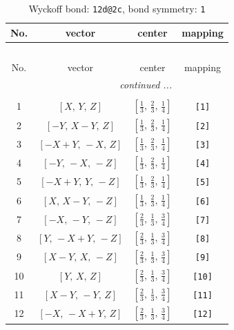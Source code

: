 \documentclass[fleqn,8pt]{jsarticle}
\begin{document}
\begin{longtable}{cccc}
\caption{Wyckoff bond: {\tt 12d@2c}, bond symmetry: {\tt 1}}
 \\
 \hline \hline
No. & vector & center & mapping \\ \hline \endfirsthead

\multicolumn{3}{l}{\tablename\ \thetable{}} \\
 \hline \hline
No. & vector & center & mapping \\ \hline \endhead

 \hline \hline
\multicolumn{3}{r}{\footnotesize\it continued ...} \\ \endfoot

 \hline \hline
\multicolumn{3}{r}{} \\ \endlastfoot

1 & $\left[ X,\, Y,\, Z \right]$ & $\left[ \frac{1}{3},\, \frac{2}{3},\, \frac{1}{4} \right]$ & {\tt [1]} \\ \hline
2 & $\left[ - Y,\, X - Y,\, Z \right]$ & $\left[ \frac{1}{3},\, \frac{2}{3},\, \frac{1}{4} \right]$ & {\tt [2]} \\ \hline
3 & $\left[ - X + Y,\, - X,\, Z \right]$ & $\left[ \frac{1}{3},\, \frac{2}{3},\, \frac{1}{4} \right]$ & {\tt [3]} \\ \hline
4 & $\left[ - Y,\, - X,\, - Z \right]$ & $\left[ \frac{1}{3},\, \frac{2}{3},\, \frac{1}{4} \right]$ & {\tt [4]} \\ \hline
5 & $\left[ - X + Y,\, Y,\, - Z \right]$ & $\left[ \frac{1}{3},\, \frac{2}{3},\, \frac{1}{4} \right]$ & {\tt [5]} \\ \hline
6 & $\left[ X,\, X - Y,\, - Z \right]$ & $\left[ \frac{1}{3},\, \frac{2}{3},\, \frac{1}{4} \right]$ & {\tt [6]} \\ \hline
7 & $\left[ - X,\, - Y,\, - Z \right]$ & $\left[ \frac{2}{3},\, \frac{1}{3},\, \frac{3}{4} \right]$ & {\tt [7]} \\ \hline
8 & $\left[ Y,\, - X + Y,\, - Z \right]$ & $\left[ \frac{2}{3},\, \frac{1}{3},\, \frac{3}{4} \right]$ & {\tt [8]} \\ \hline
9 & $\left[ X - Y,\, X,\, - Z \right]$ & $\left[ \frac{2}{3},\, \frac{1}{3},\, \frac{3}{4} \right]$ & {\tt [9]} \\ \hline
10 & $\left[ Y,\, X,\, Z \right]$ & $\left[ \frac{2}{3},\, \frac{1}{3},\, \frac{3}{4} \right]$ & {\tt [10]} \\ \hline
11 & $\left[ X - Y,\, - Y,\, Z \right]$ & $\left[ \frac{2}{3},\, \frac{1}{3},\, \frac{3}{4} \right]$ & {\tt [11]} \\ \hline
12 & $\left[ - X,\, - X + Y,\, Z \right]$ & $\left[ \frac{2}{3},\, \frac{1}{3},\, \frac{3}{4} \right]$ & {\tt [12]} \\
\end{longtable}
\end{document}
